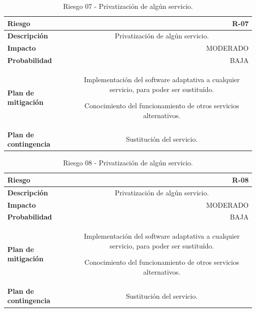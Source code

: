         \begin{table}[H]
        \centering
        \begin{tabular}{|l|c}
        \hline
        \textbf{Riesgo}               & \multicolumn{1}{r|}{R-07}                                             \\ \hline
        \textbf{Descripción}          & \multicolumn{1}{X|}{Privatización de algún servicio.}
        \\ \hline
        \textbf{Impacto}              & \multicolumn{1}{r|}{MODERADO}                                             \\ \hline
        \textbf{Probabilidad}         & \multicolumn{1}{r|}{BAJA}                                         \\ \hline
        \textbf{Plan de mitigación}   & \multicolumn{1}{X|}{ Implementación del software adaptativa a cualquier servicio, para poder ser sustituído.
        
        Conocimiento del funcionamiento de otros servicios alternativos. }
        \\ \hline
        \textbf{Plan de contingencia} & \multicolumn{1}{X|}{ Sustitución del servicio.}
        \\ \hline
        \end{tabular}
        \caption{Riesgo 07 - Privatización de algún servicio. }
        \label{table:riskpriv}
        \end{table}
        \begin{table}[H]
        \centering
        \begin{tabular}{|l|c}
        \hline
        \textbf{Riesgo}               & \multicolumn{1}{r|}{R-08}                                             \\ \hline
        \textbf{Descripción}          & \multicolumn{1}{X|}{Privatización de algún servicio.}
        \\ \hline
        \textbf{Impacto}              & \multicolumn{1}{r|}{MODERADO}                                             \\ \hline
        \textbf{Probabilidad}         & \multicolumn{1}{r|}{BAJA}                                         \\ \hline
        \textbf{Plan de mitigación}   & \multicolumn{1}{X|}{ Implementación del software adaptativa a cualquier servicio, para poder ser sustituído.
        
        Conocimiento del funcionamiento de otros servicios alternativos. }
        \\ \hline
        \textbf{Plan de contingencia} & \multicolumn{1}{X|}{ Sustitución del servicio.}
        \\ \hline
        \end{tabular}
        \caption{Riesgo 08 - Privatización de algún servicio. }
        \label{table:risk8}
        \end{table}

